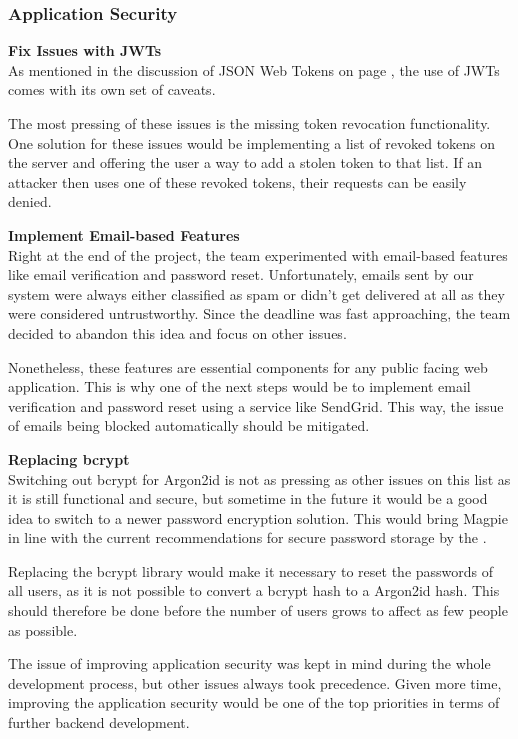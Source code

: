 \subsubsection{Application Security}
\textbf{Fix Issues with JWTs}\\
As mentioned in the discussion of JSON Web Tokens on page \pageref{jwt}, the use
of JWTs comes with its own set of caveats.

The most pressing of these issues is the missing token revocation functionality.
One solution for these issues would be implementing a list of revoked tokens on
the server and offering the user a way to add a stolen token to that list. If an
attacker then uses one of these revoked tokens, their requests can be easily
denied.

\textbf{Implement Email-based Features}\\
Right at the end of the project, the team experimented with email-based features
like email verification and password reset. Unfortunately, emails sent by our
system were always either classified as spam or didn't get delivered at all as
they were considered untrustworthy. Since the deadline was fast approaching, the
team decided to abandon this idea and focus on other issues.

Nonetheless, these features are essential components for any public facing web
application. This is why one of the next steps would be to implement email
verification and password reset using a service like SendGrid. This way, the
issue of emails being blocked automatically should be mitigated.

\textbf{Replacing bcrypt}\\
Switching out bcrypt for Argon2id is not as pressing as other issues on this
list as it is still functional and secure, but sometime in the future it would
be a good idea to switch to a newer password encryption solution. This would
bring Magpie in line with the current recommendations for secure password
storage by the \textcite{owasp_password_storage_cheatsheet}.

Replacing the bcrypt library would make it necessary to reset the passwords of
all users, as it is not possible to convert a bcrypt hash to a Argon2id hash.
This should therefore be done before the number of users grows to affect as few
people as possible.

The issue of improving application security was kept in mind during the whole
development process, but other issues always took precedence. Given more time,
improving the application security would be one of the top priorities in terms
of further backend development.

